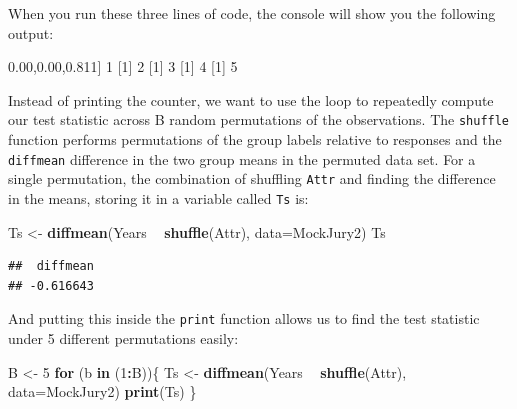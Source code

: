 \documentclass[]{book}
\newenvironment{Shaded}{\begin{snugshade}}{\end{snugshade}}
\newcommand{\KeywordTok}[1]{\textcolor[rgb]{0.13,0.29,0.53}{\textbf{#1}}}
\newcommand{\DataTypeTok}[1]{\textcolor[rgb]{0.13,0.29,0.53}{#1}}
\newcommand{\DecValTok}[1]{\textcolor[rgb]{0.00,0.00,0.81}{#1}}
\newcommand{\StringTok}[1]{\textcolor[rgb]{0.31,0.60,0.02}{#1}}
\newcommand{\ControlFlowTok}[1]{\textcolor[rgb]{0.13,0.29,0.53}{\textbf{#1}}}
\newcommand{\OperatorTok}[1]{\textcolor[rgb]{0.81,0.36,0.00}{\textbf{#1}}}
\newcommand{\NormalTok}[1]{#1}
\theoremstyle{definition}
\theoremstyle{definition}
\theoremstyle{remark}
\begin{document}
When you run these three lines of code, the console will show you the
following output:

\begin{Shaded}
\begin{Highlighting}[]
\NormalTok{[}\DecValTok{1}\NormalTok{] }\DecValTok{1}
\NormalTok{[}\DecValTok{1}\NormalTok{] }\DecValTok{2}
\NormalTok{[}\DecValTok{1}\NormalTok{] }\DecValTok{3}
\NormalTok{[}\DecValTok{1}\NormalTok{] }\DecValTok{4}
\NormalTok{[}\DecValTok{1}\NormalTok{] }\DecValTok{5}
\end{Highlighting}
\end{Shaded}

Instead of printing the counter, we want to use the loop to repeatedly
compute our test statistic across B random permutations of the
observations. The \texttt{shuffle} function performs permutations of the
group labels relative to responses and the \texttt{diffmean} difference
in the two group means in the permuted data set. For a single
permutation, the combination of shuffling \texttt{Attr} and finding the
difference in the means, storing it in a variable called \texttt{Ts} is:

\begin{Shaded}
\begin{Highlighting}[]
\NormalTok{Ts <-}\StringTok{ }\KeywordTok{diffmean}\NormalTok{(Years }\OperatorTok{~}\StringTok{ }\KeywordTok{shuffle}\NormalTok{(Attr), }\DataTypeTok{data=}\NormalTok{MockJury2)}
\NormalTok{Ts}
\end{Highlighting}
\end{Shaded}

\begin{verbatim}
##  diffmean 
## -0.616643
\end{verbatim}

And putting this inside the \texttt{print} function allows us to find
the test statistic under 5 different permutations easily:

\begin{Shaded}
\begin{Highlighting}[]
\NormalTok{B <-}\StringTok{ }\DecValTok{5}
\ControlFlowTok{for}\NormalTok{ (b }\ControlFlowTok{in}\NormalTok{ (}\DecValTok{1}\OperatorTok{:}\NormalTok{B))\{}
\NormalTok{  Ts <-}\StringTok{ }\KeywordTok{diffmean}\NormalTok{(Years }\OperatorTok{~}\StringTok{ }\KeywordTok{shuffle}\NormalTok{(Attr), }\DataTypeTok{data=}\NormalTok{MockJury2)}
  \KeywordTok{print}\NormalTok{(Ts)}
\NormalTok{\}}
\end{Highlighting}
\end{Shaded}
\end{document}
